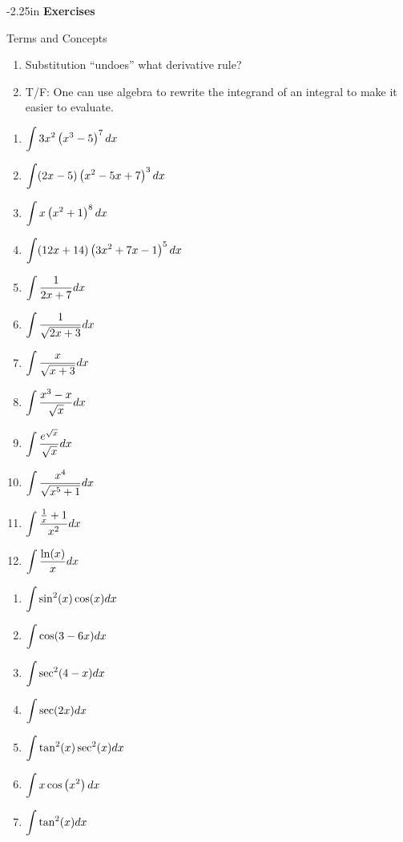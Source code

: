 \begin{adjustwidth*}{}{-2.25in}
\textbf{{\large Exercises}}
\setlength{\columnsep}{25pt}
\begin{multicols*}{2}
\noindent Terms and Concepts \small
\begin{enumerate}[1)]
\item Substitution ``undoes'' what derivative rule?
\item T/F: One can use algebra to rewrite the integrand of an integral to make it easier to evaluate.
\end{enumerate} 

 \small


\begin{enumerate}[1),resume]
\item $\displaystyle \int 3 x^2 \left(x^3-5\right)^7 dx $
\item $\displaystyle \int (2 x-5) \left(x^2-5 x+7\right)^3 dx $
\item $\displaystyle \int x \left(x^2+1\right)^8 dx $
\item $\displaystyle \int (12 x+14) \left(3 x^2+7 x-1\right)^5 dx $
\item $\displaystyle \int \frac{1}{2 x+7} dx $
\item $\displaystyle \int \frac{1}{\sqrt{2 x+3}} dx $
\item $\displaystyle \int \frac{x}{\sqrt{x+3}} dx $
\item $\displaystyle \int \frac{x^3-x}{\sqrt{x}} dx $
\item $\displaystyle \int \frac{e^{\sqrt{x}}}{\sqrt{x}} dx $
\item $\displaystyle \int \frac{x^4}{\sqrt{x^5+1}} dx $
\item $\displaystyle \int \frac{\frac{1}{x}+1}{x^2} dx $
\item $\displaystyle \int \frac{\ln(x)}{x} dx $
\end{enumerate}


\begin{enumerate}[1),resume]
\item $\displaystyle \int \sin ^2(x) \cos (x) dx $
\item $\displaystyle \int \cos (3-6 x) dx $
\item $\displaystyle \int \sec ^2(4-x) dx $
\item $\displaystyle \int \sec (2 x) dx $
\item $\displaystyle \int \tan ^2(x) \sec ^2(x) dx $
\item $\displaystyle \int x \cos \left(x^2\right) dx $
\item $\displaystyle \int \tan ^2(x) dx $
\end{enumerate}


\end{multicols*}
\end{adjustwidth*}
